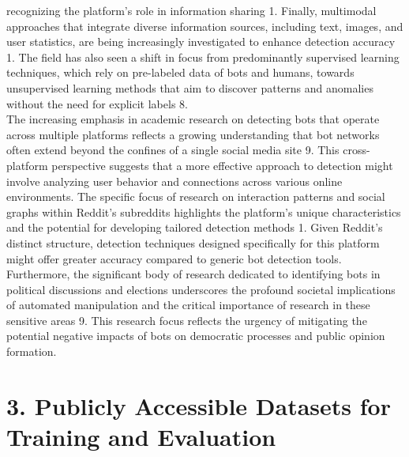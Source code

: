\documentclass[
  12pt,
  letterpaper,
  DIV=11,
  numbers=noendperiod]{scrartcl}
\begin{document}
recognizing the platform's role in information sharing 1. Finally,
multimodal approaches that integrate diverse information sources,
including text, images, and user statistics, are being increasingly
investigated to enhance detection accuracy 1. The field has also seen a
shift in focus from predominantly supervised learning techniques, which
rely on pre-labeled data of bots and humans, towards unsupervised
learning methods that aim to discover patterns and anomalies without the
need for explicit labels 8.\\
The increasing emphasis in academic research on detecting bots that
operate across multiple platforms reflects a growing understanding that
bot networks often extend beyond the confines of a single social media
site 9. This cross-platform perspective suggests that a more effective
approach to detection might involve analyzing user behavior and
connections across various online environments. The specific focus of
research on interaction patterns and social graphs within Reddit's
subreddits highlights the platform's unique characteristics and the
potential for developing tailored detection methods 1. Given Reddit's
distinct structure, detection techniques designed specifically for this
platform might offer greater accuracy compared to generic bot detection
tools. Furthermore, the significant body of research dedicated to
identifying bots in political discussions and elections underscores the
profound societal implications of automated manipulation and the
critical importance of research in these sensitive areas 9. This
research focus reflects the urgency of mitigating the potential negative
impacts of bots on democratic processes and public opinion formation.

\section{\texorpdfstring{\textbf{3. Publicly Accessible Datasets for
Training and
Evaluation}}{3. Publicly Accessible Datasets for Training and Evaluation}}\label{publicly-accessible-datasets-for-training-and-evaluation}
\end{document}
